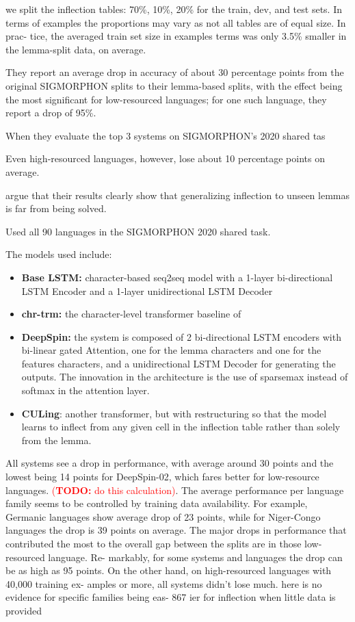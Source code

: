 \documentclass[11pt]{article}
\newcommand{\todo}[1]{\textcolor{red}{(\textbf{TODO:} #1)}}
\begin{document}
we split the inflection tables: 70\%, 10\%, 20\% for the train, dev, and test sets. 
In terms of examples the proportions may vary as not all tables are of equal size. In prac- tice, the averaged train set size in examples terms was only 3.5\% smaller in the lemma-split data, on average.


They report an average drop in accuracy of about 30 percentage points from the original SIGMORPHON splits to their lemma-based splits, with the effect being the most significant for low-resourced languages; for one such language, they report a drop of 95\%. 



When they evaluate the top 3 systems on SIGMORPHON's 2020 shared tas

Even high-resourced languages, however, lose about 10 percentage points on average. 


\citeauthor{goldman-etal-2022-un} argue that their results clearly show that generalizing inflection to unseen lemmas is far from being solved. 





Used all 90 languages in the SIGMORPHON 2020 shared task. 

The models used include: 
\begin{itemize}
\item \textbf{Base LSTM:} character-based seq2seq model with a 1-layer bi-directional LSTM Encoder and a 1-layer unidirectional LSTM Decoder
\item \textbf{chr-trm:} the character-level transformer baseline of \citet{wu-etal-2021-applying}
\item \textbf{DeepSpin:} the system is composed of 2 bi-directional LSTM encoders with bi-linear gated Attention, one for the lemma characters and one for the features characters, and a unidirectional LSTM Decoder for generating the outputs. The innovation in the architecture is the use of sparsemax \citep{sparsemax} instead of softmax in the attention layer. \citep{peters-martins-2020-one}
\item \textbf{CULing}: another transformer, but with restructuring so that the model learns to inflect from any given cell in the inflection table rather than solely from the lemma. \citep{liu-hulden-2020-leveraging}
\end{itemize}

All systems see a drop in performance, with average around 30 points and the lowest being 14 points for DeepSpin-02, which fares better for low-resource languages. \todo{do this calculation}. 
The average performance per language family seems to be controlled by training data availability. For example, Germanic languages show average drop of 23 points, while for Niger-Congo languages the drop is 39 points on average.
The major drops in performance that contributed the most to the overall gap between the splits are in those low-resourced language. Re- markably, for some systems and languages the drop can be as high as 95 points.
On the other hand, on high-resourced languages with 40,000 training ex- amples or more, all systems didn’t lose much. here is no evidence for specific families being eas-
  867
ier for inflection when little data is provided
\end{document}
